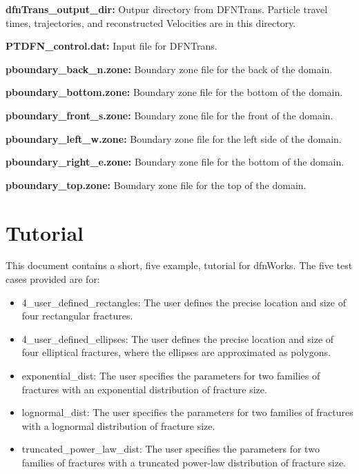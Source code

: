 \documentclass[letterpaper,10pt,english]{sphinxmanual}
\begin{document}
\textbf{dfnTrans\_output\_dir:}
\label{output:dfntrans-output-dir}
Outpur directory from DFNTrans. Particle travel times, trajectories, and reconstructed Velocities are in this directory.

\textbf{PTDFN\_control.dat:}
\label{output:ptdfn-control-dat}
Input file for DFNTrans.

\textbf{pboundary\_back\_n.zone:}
\label{output:pboundary-back-n-zone}
Boundary zone file for the back of the domain.

\textbf{pboundary\_bottom.zone:}
\label{output:pboundary-bottom-zone}
Boundary zone file for the bottom of the domain.

\textbf{pboundary\_front\_s.zone:}
\label{output:pboundary-front-s-zone}
Boundary zone file for the front of the domain.

\textbf{pboundary\_left\_w.zone:}
\label{output:pboundary-left-w-zone}
Boundary zone file for the left side of the domain.

\textbf{pboundary\_right\_e.zone:}
\label{output:pboundary-right-e-zone}
Boundary zone file for the bottom of the domain.

\textbf{pboundary\_top.zone:}
\label{output:pboundary-top-zone}
Boundary zone file for the top of the domain.


\chapter{Tutorial}
\label{tutorial::doc}\label{tutorial:tutorial}
This document contains a short, five example, tutorial for dfnWorks. The five test cases provided are for:
\begin{itemize}
\item {} 
4\_user\_defined\_rectangles: The user defines the precise location and size of four rectangular fractures.

\item {} 
4\_user\_defined\_ellipses: The user defines the precise location and size of four elliptical fractures, where the ellipses are approximated as polygons.

\item {} 
exponential\_dist: The user specifies the parameters for two families of fractures with an exponential distribution of fracture size.

\item {} 
lognormal\_dist: The user specifies the parameters for two families of fractures with a lognormal distribution of fracture size.

\item {} 
truncated\_power\_law\_dist: The user specifies the parameters for two families of fractures with a truncated power-law distribution of fracture size.

\end{itemize}
\end{document}
